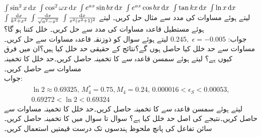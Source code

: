 \quad 
$\int \sin^2 x\dif x$
\quad 
$\int \cos^2 \omega x\dif x$
\quad 
$\int e^{ax}\sin bx\dif x$
\quad 
$\int e^{ax}\cos bx\dif x$
\quad 
$\int \tan kx\dif x$
\quad 
$\int \ln x\dif x$
\quad 
$\int \frac{\dif x}{k^2+x^2}$
\quad 
$\int \frac{\dif x}{\sqrt{a^2-x^2}}$
\quad 
$\int \frac{\dif x}{x^2(x^2+1)^2}$
\quad
{} لیتے ہوئے مساوات  کی مدد سے مثال  حل کریں۔
\quad
{} لیتے ہوئے مستطیل قاعدہ مساوات کی مدد سے  حل کریں۔ خلل کتنا ہو گا؟\\
جواب:\quad
$0.245,\,\,\epsilon=-0.005$
\quad
{} لیتے ہوئے سوال  کو ذوزنقہ قاعدہ مساوات  سے حل کریں۔مساوات  سے حد خلل کیا حاصل ہوں گے؟نتائج کے حقیقی حد خلل کیا ہیں؟ان میں فرق کیوں ہے؟
\quad
{} لیتے ہوئے سمسن قاعدہ سے  کا تخمینہ حاصل کریں۔حد خلل کا تخمینہ مساوات  سے حاصل کریں۔\\
جواب:\quad
\begin{align*}
\ln 2\approx \num{0.69325},\,M_4^*=0.75, M_4=0.24,\, \num{0.000016}<\epsilon_S<\num{0.00053}, \\
\num{0.69272}<\ln 2<\num{0.69324}
\end{align*}
\quad
{} لیتے ہوئے سمسن قاعدہ سے  کا تخمینہ حاصل کریں۔حد خلل کا تخمینہ مساوات  سے حاصل کریں۔نتیجے کی اصل حد خلل کیا ہے؟
سوال  تا سوال  میں  کا تخمینہ حاصل کریں۔ سائن تفاعل کی پانچ ملحوظ ہندسوں تک درست قیمتیں استعمال کریں۔

